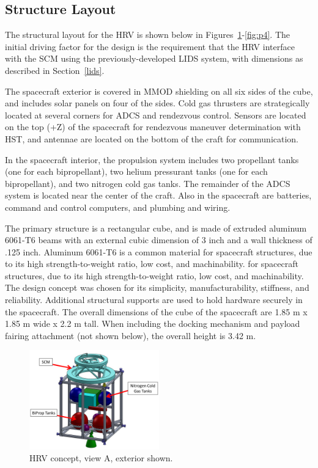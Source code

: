 \documentclass[paper=letter, fontsize=11pt]{scrartcl} %
\numberwithin{equation}{section} %
\numberwithin{figure}{section} %
\numberwithin{table}{section} %
\begin{document}
\subsection{Structure Layout}
The structural layout for the HRV is shown below in Figures~\ref{fig:p1}-\ref{fig:p4}. The initial driving factor for the design is the requirement that the HRV interface with the SCM using the previously-developed LIDS system, with dimensions as described in Section~\ref{lids}.

The spacecraft exterior is covered in MMOD shielding on all six sides of the cube, and includes solar panels on four of the sides. Cold gas thrusters are strategically located at several corners for ADCS and rendezvous control. Sensors are located on the top (+Z) of the spacecraft for rendezvous maneuver determination with HST, and antennae are located on the bottom of the craft for communication.

In the spacecraft interior, the propulsion system includes two propellant tanks (one for each bipropellant), two helium pressurant tanks (one for each bipropellant), and two nitrogen cold gas tanks. The remainder of the ADCS system is located near the center of the craft. Also in the spacecraft are batteries, command and control computers, and plumbing and wiring.

The primary structure is a rectangular cube, and is made of extruded aluminum 6061-T6 beams with an external cubic dimension of 3 inch and a wall thickness of .125 inch. Aluminum 6061-T6 is a common material for spacecraft structures, due to its high strength-to-weight ratio, low cost, and machinability. for spacecraft structures, due to its high strength-to-weight ratio, low cost, and machinability. The design concept was chosen for its simplicity, manufacturability, stiffness, and reliability. Additional structural supports are used to hold hardware securely in the spacecraft. The overall dimensions of the cube of the spacecraft are 1.85 m x 1.85 m wide x 2.2 m tall. When including the docking mechanism and payload fairing attachment (not shown below), the overall height is 3.42 m.

\begin{figure}[H]
    \begin{center}
    \includegraphics[width=0.5\textwidth]{Pics/1.png}
    \caption{HRV concept, view A, exterior shown.}
    \label{fig:p1}
    \end{center}
\end{figure}
\end{document}
